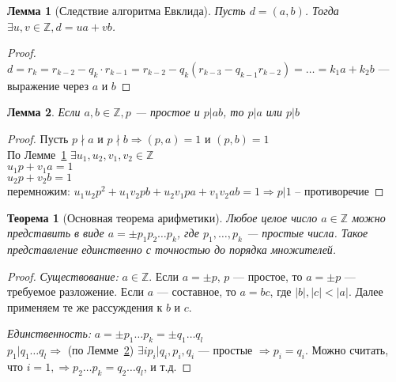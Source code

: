 \documentclass[a4paper]{article}
\theoremstyle{definition}
\theoremstyle{plain}
\newtheorem{theorem}{Теорема}
\newtheorem{lemma}{Лемма}
\begin{document}
\begin{lemma}[Следствие алгоритма Евклида]\label{lemma:1}
  Пусть $d = (a, b)$.
  Тогда $\exists u, v \in \mathbb{Z}, d = ua + vb$.
\end{lemma}
\begin{proof}
  $d = r_{k} = r_{k - 2} - q_{k} \cdot r_{k - 1} = r_{k - 2} - q_{k}(r_{k - 3} - q_{k - 1}r_{k - 2}) = \ldots = k_{1}a + k_{2}b$ --- выражение через $a$ и $b$
\end{proof}

\begin{lemma}\label{lemma:2}
  Если $a, b \in \mathbb{Z}, p$ --- простое и $p | ab$, то $p|a$ или $p|b$
\end{lemma}
\begin{proof}
  Пусть $p \nmid a$ и $p \nmid b \Rightarrow (p, a) = 1$ и $(p, b) = 1$\\
  По Лемме~\ref{lemma:1} $\exists u_{1},u_{2},v_{1}, v_{2} \in \mathbb{Z}$\\
  $u_{1}p+v_{1}a = 1$\\
  $u_{2}p+v_{2}b = 1$ \\
  перемножим: $u_{1}u_{2}p^{2} + u_{1}v_{2}pb + u_{2}v_{1}pa + v_{1}v_{2}ab = 1 \Rightarrow p|1$ -- противоречие
\end{proof}

\begin{theorem}[Основная теорема арифметики]
  Любое целое число $a \in \mathbb{Z}$ можно представить в виде $a = \pm p_{1}p_{2}\ldots p_{k}$, где $p_{1}, \ldots, p_{k}$ --- простые числа.
  Такое представление единственно с точностью до порядка множителей.
\end{theorem}
\begin{proof}
  \emph{Существование:}
  $a \in \mathbb{Z}$. Если $a = \pm p$, $p$ --- простое, то $a = \pm p$ --- требуемое разложение.
  Если $a$ --- составное, то $a = bc$, где $|b|, |c| < |a|$.
  Далее применяем те же рассуждения к $b$ и $c$.

  \emph{Единственность:}
  $a = \pm p_{1} \ldots p_{k} = \pm q_{1} \ldots q_{l}$\\
  $p_{1}|q_{1} \ldots q_{l} \Rightarrow$ (по Лемме~\ref{lemma:2}) $\exists i p_{i}|q_{i}, p_{i},q_{i}$ --- простые $\Rightarrow p_{i} = q_{i}$.
  Можно считать, что $i = 1, \Rightarrow p_{2} \ldots p_{k} = q_{2} \ldots q_{l}$, и т.д.
\end{proof}
\end{document}
